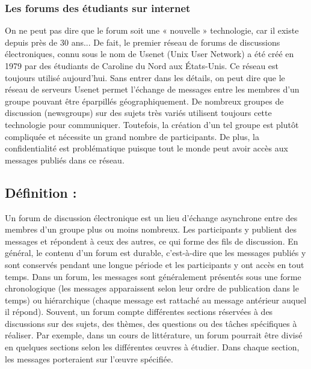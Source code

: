 \documentclass[12pt,a4paper,titlepage]{article}
\begin{document}
\subsubsection{Les forums des étudiants sur internet}
On ne peut pas dire que le forum soit une « nouvelle » technologie, car il existe depuis près de
30 ans... De fait, le premier réseau de forums de discussions électroniques, connu sous le nom
de Usenet (Unix User Network) a été créé en 1979 par des étudiants de Caroline du Nord aux
États-Unis. Ce réseau est toujours utilisé aujourd'hui. Sans entrer dans les détails, on peut dire
que le réseau de serveurs Usenet permet l'échange de messages entre les membres d'un groupe
pouvant être éparpillés géographiquement. De nombreux groupes de discussion (newsgroups)
sur des sujets très variés utilisent toujours cette technologie pour communiquer. Toutefois, la
création d'un tel groupe est plutôt compliquée et nécessite un grand nombre de participants. De
plus, la confidentialité est problématique puisque tout le monde peut avoir accès aux messages
publiés dans ce réseau. \newline
\subsection{Définition :}
Un forum de discussion électronique est un lieu d'échange asynchrone entre des
membres d'un groupe plus ou moins nombreux. Les participants y publient des messages et
répondent à ceux des autres, ce qui forme des fils de discussion. En général, le contenu d'un
forum est durable, c'est-à-dire que les messages publiés y sont conservés pendant une longue
période et les participants y ont accès en tout temps. Dans un forum, les messages sont
généralement présentés sous une forme chronologique (les messages apparaissent selon leur
ordre de publication dans le temps) ou hiérarchique (chaque message est rattaché au message
antérieur auquel il répond). Souvent, un forum compte différentes sections réservées à des
discussions sur des sujets, des thèmes, des questions ou des tâches spécifiques à réaliser. Par exemple,
dans un cours de littérature, un forum pourrait être divisé en quelques sections selon les différentes
œuvres à étudier. Dans chaque section, les messages porteraient sur l'œuvre spécifiée. \newline
\end{document}
